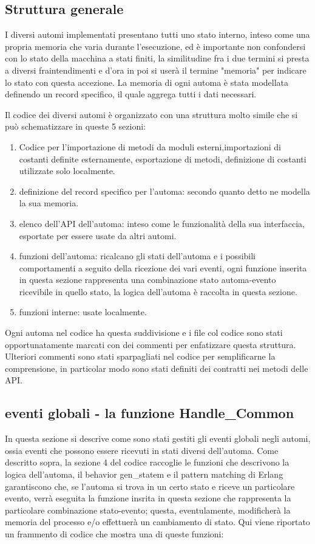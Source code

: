 \subsection{Struttura generale} \label{strutturaGeneraleAutomi}
I diversi automi implementati presentano tutti uno stato interno, inteso come una propria memoria che varia durante l'esecuzione, ed è importante non confondersi con lo stato della macchina a stati finiti, la similitudine fra i due termini si presta a diversi fraintendimenti e d'ora in poi si userà il termine "memoria" per indicare lo stato con questa accezione. La memoria di ogni automa è stata modellata definendo un record specifico, il quale aggrega tutti i dati necessari.

Il codice dei diversi automi è organizzato con una struttura molto simile che si può schematizzare in queste 5 sezioni:

\begin{enumerate}
	\item Codice per l'importazione di metodi da moduli esterni,importazioni di costanti definite esternamente, esportazione di metodi, definizione di costanti utilizzate solo localmente.
	\item definizione del record specifico per l'automa: secondo quanto detto ne modella la sua memoria.
	\item elenco dell'API dell'automa: inteso come le funzionalità della sua interfaccia, esportate per essere usate da altri automi.
	\item funzioni dell'automa: ricalcano gli stati dell'automa e i possibili comportamenti a seguito della ricezione dei vari eventi, ogni funzione inserita in questa sezione rappresenta una combinazione stato automa-evento ricevibile in quello stato, la logica dell'automa è raccolta in questa sezione.
	\item funzioni interne: usate localmente.
\end{enumerate}

Ogni automa nel codice ha questa suddivisione e i file col codice sono stati opportunatamente marcati con dei commenti per enfatizzare questa struttura. Ulteriori commenti sono stati sparpagliati nel codice per semplificarne la comprensione, in particolar modo sono stati definiti dei contratti nei metodi delle API.

\subsection{eventi globali - la funzione Handle\_Common} \label{eventiGlobaliAutomi}
In questa sezione si descrive come sono stati gestiti gli eventi globali negli automi, ossia eventi che possono essere ricevuti in stati diversi dell'automa. Come descritto sopra, la sezione 4 del codice raccoglie le funzioni che descrivono la logica dell'automa, il behavior gen\_statem e il pattern matching di Erlang garantiscono che, se l'automa si trova in un certo stato e riceve un particolare evento, verrà eseguita la funzione insrita in questa sezione che rappresenta la particolare combinazione stato-evento; questa, eventulamente, modificherà la memoria del processo e/o  effettuerà un cambiamento di stato. 
Qui viene riportato un frammento di codice che mostra una di queste funzioni: 

